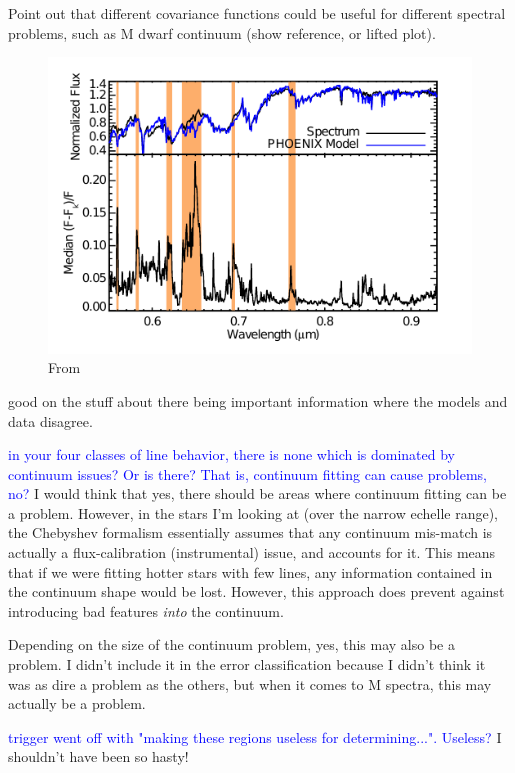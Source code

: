 \documentclass[preprint]{aastex} %
\newcommand{\hcom}[1]{ \textcolor{Blue}{#1}}
\begin{document}
Point out that different covariance functions could be useful for different spectral problems, such as M dwarf continuum (show reference, or lifted plot).

\begin{figure}[!htb]
\begin{center}
\includegraphics{mann}
\caption{From \citet{mga13}}
\label{fig:mann}
\end{center}
\end{figure}

good on the stuff about there being important information where the models and data disagree.

\hcom{in your four classes of line behavior, there is none which is dominated by continuum issues? Or is there? That is, continuum fitting can cause problems, no?}
I would think that yes, there should be areas where continuum fitting can be a problem. However, in the stars I'm looking at (over the narrow echelle range), the Chebyshev formalism essentially assumes that any continuum mis-match is actually a flux-calibration (instrumental) issue, and accounts for it. This means that if we were fitting hotter stars with few lines, any information contained in the continuum shape would be lost. However, this approach does prevent against introducing bad features \emph{into} the continuum.

Depending on the size of the continuum problem, yes, this may also be a problem. I didn't include it in the error classification because I didn't think it was as dire a problem as the others, but when it comes to M spectra, this may actually be a problem.

\hcom{trigger went off with "making these regions useless for determining...". Useless?}
I shouldn't have been so hasty!
\end{document}
